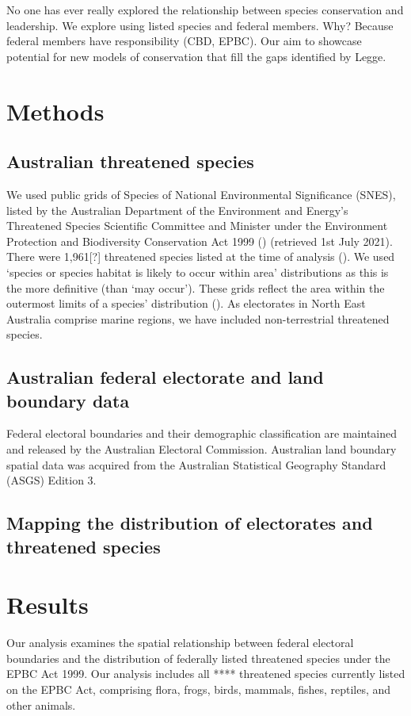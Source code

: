 \documentclass[a4paper,11pt]{article}
\begin{document}
No one has ever really explored the relationship between species conservation and leadership. We explore using listed species and federal members. Why? Because federal members have responsibility (CBD, EPBC). Our aim to showcase potential for new models of conservation that fill the gaps identified by Legge. 

\section{Methods}

\subsection{Australian threatened species}
We used public grids of Species of National Environmental Significance (SNES), listed by the Australian Department of the Environment and Energy’s Threatened Species Scientific Committee and Minister under the Environment Protection and Biodiversity Conservation Act 1999 (\cite{commonwealthofaustraliaThreatenedSpeciesEPBC2021}) (retrieved 1st July 2021). 
There were 1,961[?] threatened species listed at the time of analysis (\cite{commonwealthofaustraliaThreatenedSpeciesEPBC2021}). We used ‘species or species habitat is likely to occur within area’ distributions as this is the more definitive (than ‘may occur’). These grids reflect the area within the outermost limits of a species’ distribution (\cite{gastonSizesSpeciesGeographic2009}).
As electorates in North East Australia comprise marine regions, we have included non-terrestrial threatened species.

\subsection{Australian federal electorate and land boundary data}
Federal electoral boundaries and their demographic classification are maintained and released by the Australian Electoral Commission.
Australian land boundary spatial data was acquired from the Australian Statistical Geography Standard (ASGS) Edition 3.

\subsection{Mapping the distribution of electorates and threatened species}



\section{Results}
Our analysis examines the spatial relationship between federal electoral boundaries and the distribution of federally listed threatened species under the EPBC Act 1999. Our analysis includes all **** threatened species currently listed on the EPBC Act, comprising flora, frogs, birds, mammals, fishes, reptiles, and other animals. 
\end{document}
